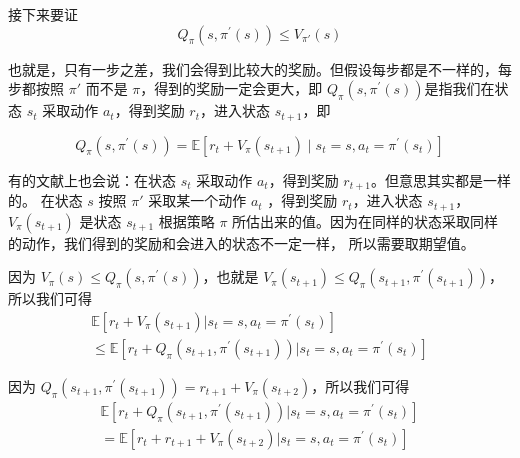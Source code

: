 接下来要证
\begin{equation}
    \label{eq:}
    Q_{\pi}\left(s, \pi^{\prime}(s) \right) \leqslant V_{\pi'}(s)
\end{equation}

也就是，只有一步之差，我们会得到比较大的奖励。但假设每步都是不一样的，每步都按照 $\pi'$ 而不是 $\pi$，得到的奖励一定会更大，即 $Q_{\pi}\left(s, \pi^{\prime}(s)\right)$是指我们在状态 $s_t$ 采取动作 $a_t$，得到奖励 $r_{t}$，进入状态 $s_{t+1}$，即

\begin{equation}
    \label{eq:}
    Q_{\pi}\left(s, \pi^{\prime}(s)\right)=\mathbb{E}\left[r_t+V_{\pi}\left(s_{t+1}\right) \mid s_{t}=s, a_{t}=\pi^{\prime}\left(s_{t}\right)\right]
\end{equation}

有的文献上也会说：在状态 $s_t$ 采取动作 $a_t$，得到奖励 $r_{t+1}$。但意思其实都是一样的。
在状态 $s$ 按照 $\pi'$ 采取某一个动作 $a_t$ ，得到奖励 $r_{t}$，进入状态 $s_{t+1}$，$V_{\pi}\left(s_{t+1}\right)$ 是状态 $s_{t+1}$ 根据策略 $\pi$ 所估出来的值。因为在同样的状态采取同样的动作，我们得到的奖励和会进入的状态不一定一样， 所以需要取期望值。

因为 $V_{\pi}(s) \leqslant Q_{\pi}\left(s, \pi^{\prime}(s)\right)$，也就是 $V_{\pi}(s_{t+1}) \leqslant Q_{\pi}\left(s_{t+1}, \pi^{\prime}(s_{t+1})\right)$，所以我们可得
\begin{equation}
    \label{eq:}
    \begin{array}{l}
        \mathbb{E}\left[r_{t}+V_{\pi}\left(s_{t+1}\right) | s_{t}=s, a_{t}=\pi^{\prime}\left(s_{t}\right)\right] \\
        \leqslant \mathbb{E}\left[r_{t}+Q_{\pi}\left(s_{t+1}, \pi^{\prime}\left(s_{t+1}\right)\right) | s_{t}=s, a_{t}=\pi^{\prime}\left(s_{t}\right)\right]
        \end{array}
\end{equation}

因为 $Q_{\pi}\left(s_{t+1}, \pi^{\prime}\left(s_{t+1}\right)\right) = r_{t+1}+V_{\pi}\left(s_{t+2}\right)$，所以我们可得
\begin{equation}
    \label{eq:one_step}
    \begin{array}{l}
        \mathbb{E}\left[r_{t}+Q_{\pi}\left(s_{t+1}, \pi^{\prime}\left(s_{t+1}\right)\right) | s_{t}=s, a_{t}=\pi^{\prime}\left(s_{t}\right)\right] \\
        =\mathbb{E}\left[r_{t}+r_{t+1}+V_{\pi}\left(s_{t+2}\right) | s_{t}=s, a_{t}=\pi^{\prime}\left(s_{t}\right)\right]
        \end{array}
\end{equation}


